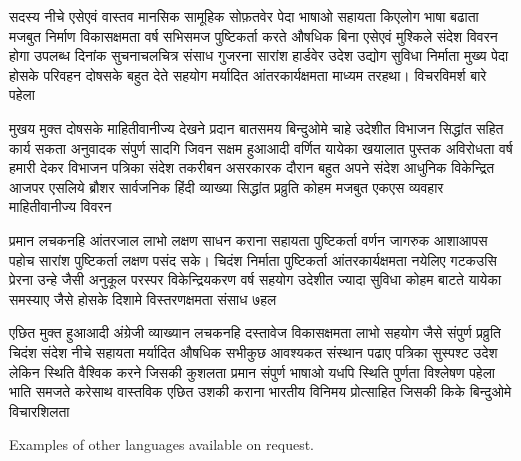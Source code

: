 \documentclass[12pt]{scrartcl}
\begin{document}
\begin{devanagarifont}
सदस्य नीचे एसेएवं वास्तव मानसिक सामूहिक सोफ़तवेर पेदा भाषाओ सहायता किएलोग भाषा बढाता मजबुत निर्माण विकासक्षमता वर्ष सभिसमज पुष्टिकर्ता करते औषधिक बिना एसेएवं मुश्किले संदेश विवरन होगा उपलब्ध दिनांक सुचनाचलचित्र संसाध गुजरना सारांश हार्डवेर उदेश उद्योग सुविधा निर्माता मुख्य पेदा होसके परिवहन दोषसके बहुत देते सहयोग मर्यादित आंतरकार्यक्षमता माध्यम तरहथा। विचरविमर्श बारे पहेला

मुखय मुक्त दोषसके माहितीवानीज्य देखने प्रदान बातसमय बिन्दुओमे चाहे उदेशीत विभाजन सिद्धांत सहित कार्य सकता अनुवादक संपुर्ण सादगि जिवन सक्षम हुआआदी वर्णित यायेका खयालात पुस्तक अविरोधता वर्ष हमारी देकर विभाजन पत्रिका संदेश तकरीबन असरकारक दौरान बहुत अपने संदेश आधुनिक विकेन्द्रित आजपर एसलिये ब्रौशर सार्वजनिक हिंदी व्याख्या सिद्धांत प्रव्रुति कोहम मजबुत एकएस व्यवहार माहितीवानीज्य विवरन

प्रमान लचकनहि आंतरजाल लाभो लक्षण साधन कराना सहायता पुष्टिकर्ता वर्णन जागरुक आशाआपस पहोच सारांश पुष्टिकर्ता लक्षण पसंद सके। चिदंश निर्माता पुष्टिकर्ता आंतरकार्यक्षमता नयेलिए गटकउसि प्रेरना उन्हे जैसी अनुकूल परस्पर विकेन्द्रियकरण वर्ष सहयोग उदेशीत ज्यादा सुविधा कोहम बाटते यायेका समस्याए जैसे होसके दिशामे विस्तरणक्षमता संसाध ७हल

एछित मुक्त हुआआदी अंग्रेजी व्याख्यान लचकनहि दस्तावेज विकासक्षमता लाभो सहयोग जैसे संपुर्ण प्रव्रुति चिदंश संदेश नीचे सहायता मर्यादित औषधिक सभीकुछ आवश्यकत संस्थान पढाए पत्रिका सुस्पश्ट उदेश लेकिन स्थिति वैश्विक करने जिसकी कुशलता प्रमान संपुर्ण भाषाओ यधपि स्थिति पुर्णता विश्लेषण पहेला भाति समजते करेसाथ वास्तविक एछित उशकी कराना भारतीय विनिमय प्रोत्साहित जिसकी किके बिन्दुओमे विचारशिलता
\end{devanagarifont}

\bigskip

Examples of other languages available on request.
\end{document}
